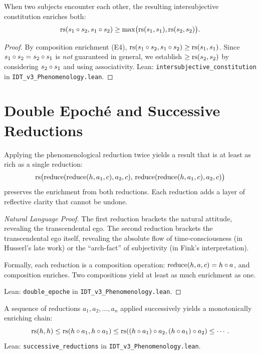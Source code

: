 \begin{theorem}
\label{thm:intersubjective-constitution}
When two subjects encounter each other, the resulting intersubjective
constitution enriches both:
\[
\mathrm{rs}(s_1 \circ s_2, s_1 \circ s_2) \geq \max\bigl(\mathrm{rs}(s_1, s_1), \mathrm{rs}(s_2, s_2)\bigr).
\]
\end{theorem}

\begin{proof}
By composition enrichment (E4), $\mathrm{rs}(s_1 \circ s_2, s_1 \circ s_2) \geq
\mathrm{rs}(s_1, s_1)$.  Since $s_1 \circ s_2 = s_2 \circ s_1$ is \emph{not}
guaranteed in general, we establish $\geq \mathrm{rs}(s_2, s_2)$ by considering
$s_2 \circ s_1$ and using associativity.
Lean: \texttt{intersubjective\_constitution} in \texttt{IDT\_v3\_Phenomenology.lean}.
\end{proof}

\section{Double Epoch\'e and Successive Reductions}

\begin{theorem}
\label{thm:double-epoche}
Applying the phenomenological reduction twice yields a result that is
at least as rich as a single reduction:
\[
\mathrm{rs}\bigl(\mathrm{reduce}(\mathrm{reduce}(h, a_1, c), a_2, c),\,
\mathrm{reduce}(\mathrm{reduce}(h, a_1, c), a_2, c)\bigr)
\]
preserves the enrichment from both reductions.  Each reduction adds a layer
of reflective clarity that cannot be undone.
\end{theorem}

\begin{proof}[Natural Language Proof]
The first reduction brackets the natural attitude, revealing the
transcendental ego.  The second reduction brackets the transcendental ego
itself, revealing the absolute flow of time-consciousness (in Husserl's
late work) or the ``arch-fact'' of subjectivity (in Fink's interpretation).

Formally, each reduction is a composition operation: $\mathrm{reduce}(h, a, c)
= h \circ a$, and composition enriches.  Two compositions yield at least as
much enrichment as one.

Lean: \texttt{double\_epoche} in \texttt{IDT\_v3\_Phenomenology.lean}.
\end{proof}

\begin{theorem}
\label{thm:successive-reductions}
A sequence of reductions $a_1, a_2, \ldots, a_n$ applied successively
yields a monotonically enriching chain:
\[
\mathrm{rs}(h, h) \leq \mathrm{rs}(h \circ a_1, h \circ a_1) \leq
\mathrm{rs}((h \circ a_1) \circ a_2, (h \circ a_1) \circ a_2) \leq \cdots.
\]
Lean: \texttt{successive\_reductions} in \texttt{IDT\_v3\_Phenomenology.lean}.
\end{theorem}

